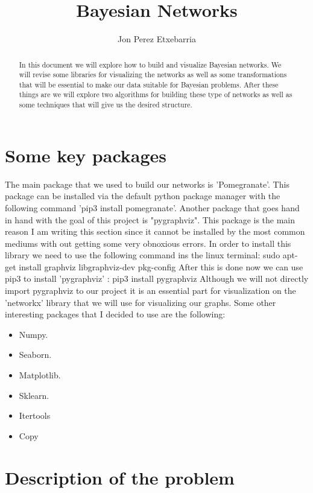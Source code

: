 \documentclass{article} %
\title{Bayesian Networks}
\author{Jon Perez Etxebarria}
\begin{document}
\maketitle
\begin{abstract}
  In this document we will explore how to build and visualize Bayesian networks. We will revise some libraries for visualizing the networks as well as some transformations that will be essential to make our data suitable for Bayesian problems. After these things are we will explore two algorithms for building these type of networks as well as some techniques that will give us the desired structure.
\end{abstract}
\section{Some key packages}
 
 The main package that we used to build our networks is 'Pomegranate'. This package can be installed via the default python package manager with the following command 'pip3 install pomegranate'.
\bigskip
Another package that goes hand in hand with the goal of this project is "pygraphviz". This package is the main reason I am writing this section since it cannot be installed by the most common mediums with out getting some very obnoxious errors.
\smallskip
In order to install this library we need to use the following command ins the linux terminal:
\smallskip
sudo apt-get install graphviz libgraphviz-dev pkg-config
\smallskip
After this is done now we can use pip3 to install 'pygraphviz' : pip3 install pygraphviz
\smallskip
Although we will not directly import pygraphviz to our project it is an essential part for visualization on the 'networkx' library that we will use for visualizing our graphs.
\bigskip
Some other interesting packages that I decided to use are the following:
\begin{itemize}
  \item Numpy.
  \item Seaborn.
  \item Matplotlib. 
  \item Sklearn.
  \item Itertools
  \item Copy
\end{itemize}
 
\section{Description of the problem}
 
\end{document}
